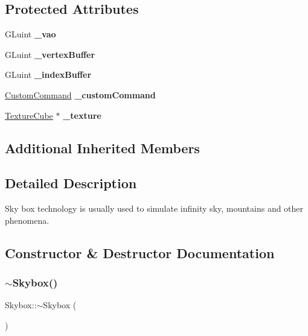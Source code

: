 \subsection*{Protected Attributes}
\begin{DoxyCompactItemize}
\item 
\mbox{\label{classSkybox_a7050963cd72cef23c5c174771b5d1e62}} 
G\+Luint {\bfseries \+\_\+vao}
\item 
\mbox{\label{classSkybox_ae56f98a988899d95fe00fdf82b8a58f5}} 
G\+Luint {\bfseries \+\_\+vertex\+Buffer}
\item 
\mbox{\label{classSkybox_a0c7e4a03b247472008b9f3090c022358}} 
G\+Luint {\bfseries \+\_\+index\+Buffer}
\item 
\mbox{\label{classSkybox_a5ea5fdff7cbe44f963d18d3443a39b0e}} 
\hyperlink{classCustomCommand}{Custom\+Command} {\bfseries \+\_\+custom\+Command}
\item 
\mbox{\label{classSkybox_a0552f78950e889df138f9d139b3fa8be}} 
\hyperlink{classTextureCube}{Texture\+Cube} $\ast$ {\bfseries \+\_\+texture}
\end{DoxyCompactItemize}
\subsection*{Additional Inherited Members}


\subsection{Detailed Description}
Sky box technology is usually used to simulate infinity sky, mountains and other phenomena. 

\subsection{Constructor \& Destructor Documentation}
\mbox{\label{classSkybox_a62ad4c6b4b1965a0a6d8536a50d4c090}} 
\subsubsection{\texorpdfstring{$\sim$\+Skybox()}{~Skybox()}\hspace{0.1cm}{\footnotesize\ttfamily [1/2]}}
{\footnotesize\ttfamily Skybox\+::$\sim$\+Skybox (\begin{DoxyParamCaption}{ }\end{DoxyParamCaption})\hspace{0.3cm}{\ttfamily [virtual]}}

